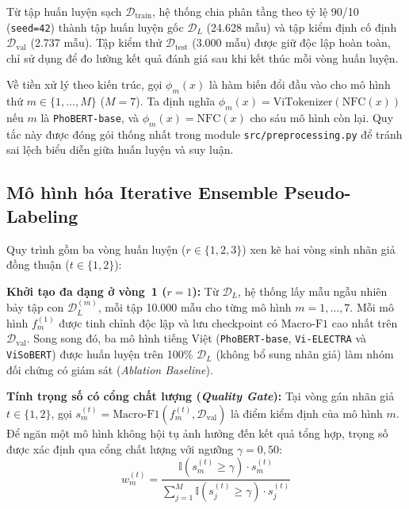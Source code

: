 \documentclass[journal,a4paper]{IEEEtran}
\newcommand{\code}[1]{\texttt{\small #1}}
\begin{document}
Từ tập huấn luyện sạch $\mathcal{D}_{\text{train}}$, hệ thống chia phân tầng theo tỷ lệ 90/10 (\code{seed=42}) thành tập huấn luyện gốc $\mathcal{D}_{L}$ (24.628 mẫu) và tập kiểm định cố định $\mathcal{D}_{\text{val}}$ (2.737 mẫu). Tập kiểm thử $\mathcal{D}_{\text{test}}$ (3.000 mẫu) được giữ độc lập hoàn toàn, chỉ sử dụng để đo lường kết quả đánh giá sau khi kết thúc mỗi vòng huấn luyện.

Về tiền xử lý theo kiến trúc, gọi $\phi_m(x)$ là hàm biến đổi đầu vào cho mô hình thứ $m \in \{1,\dots,M\}$ ($M = 7$). Ta định nghĩa $\phi_m(x) = \text{ViTokenizer}(\text{NFC}(x))$ nếu $m$ là \code{PhoBERT-base}, và $\phi_m(x) = \text{NFC}(x)$ cho sáu mô hình còn lại. Quy tắc này được đóng gói thống nhất trong module \code{src/preprocessing.py} để tránh sai lệch biểu diễn giữa huấn luyện và suy luận.

\subsection{Mô hình hóa Iterative Ensemble Pseudo-Labeling}
\label{sec:method_algo}

Quy trình gồm ba vòng huấn luyện ($r \in \{1, 2, 3\}$) xen kẽ hai vòng sinh nhãn giả đồng thuận ($t \in \{1, 2\}$):

\textbf{Khởi tạo đa dạng ở vòng~1 ($r=1$):} Từ $\mathcal{D}_{L}$, hệ thống lấy mẫu ngẫu nhiên bảy tập con $\mathcal{D}_{L}^{(m)}$, mỗi tập 10.000 mẫu cho từng mô hình $m=1,\dots,7$. Mỗi mô hình $f_m^{(1)}$ được tinh chỉnh độc lập và lưu checkpoint có $\text{Macro-F1}$ cao nhất trên $\mathcal{D}_{\text{val}}$. Song song đó, ba mô hình tiếng Việt (\code{PhoBERT-base}, \code{Vi-ELECTRA} và \code{ViSoBERT}) được huấn luyện trên 100\% $\mathcal{D}_{L}$ (không bổ sung nhãn giả) làm nhóm đối chứng có giám sát (\textit{Ablation Baseline}).

\textbf{Tính trọng số có cổng chất lượng (\textit{Quality Gate}):} Tại vòng gán nhãn giả $t \in \{1,2\}$, gọi $s_m^{(t)} = \text{Macro-F1}(f_m^{(t)}, \mathcal{D}_{\text{val}})$ là điểm kiểm định của mô hình $m$. Để ngăn một mô hình không hội tụ ảnh hưởng đến kết quả tổng hợp, trọng số được xác định qua cổng chất lượng với ngưỡng $\gamma = 0{,}50$:
\begin{equation}
  w_m^{(t)} = \frac{\mathbb{I}\!\left(s_m^{(t)} \ge \gamma\right) \cdot s_m^{(t)}}{\sum_{j=1}^{M} \mathbb{I}\!\left(s_j^{(t)} \ge \gamma\right) \cdot s_j^{(t)}}
  \label{eq:weights}
\end{equation}
\end{document}
